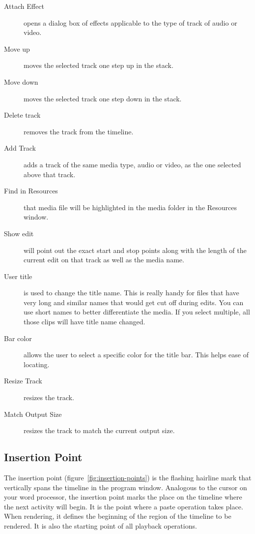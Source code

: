 \begin{description}
    \item[Attach Effect] opens a dialog box of effects applicable to the type of track of audio or video.
    \item[Move up] moves the selected track one step up in the stack.
    \item[Move down]  moves the selected track one step down in the stack.
    \item[Delete track]  removes the track from the timeline.
    \item[Add Track]  adds a track of the same media type, audio or video, as the one selected above that track.
    \item[Find in Resources]  that media file will be highlighted in the media folder in the Resources window.
    \item[Show edit]  will point out the exact start and stop points along with the length of the current edit on
        that track as well as the media name.
    \item[User title]  is used to change the title name.  This is really handy for files that have very long and
        similar names that would get cut off during edits.  You can use short names to better differentiate the
        media. If you select multiple, all those clips will have title name changed.
    \item[Bar color]  allows the user to select a specific color for the title bar.  This helps ease of locating.
    \item[Resize Track]  resizes the track.
    \item[Match Output Size]  resizes the track to match the current output size.
\end{description}


\subsection{Insertion Point}%
\label{sub:insertion_point}

The insertion point (figure~\ref{fig:insertion-points}) is the flashing hairline mark that vertically spans the timeline in the program window. 
Analogous to the cursor on your word processor, the insertion point marks the place on the timeline where the next activity will begin. 
It is the point where a paste operation takes place. 
When rendering, it defines the beginning of the region of the timeline to be rendered. It is also the starting point of all playback operations.
                           
